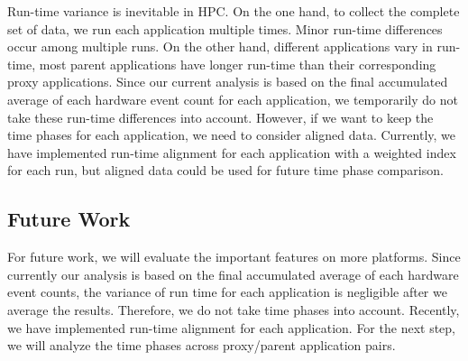 Run-time variance is inevitable in HPC. On the one hand, to collect the complete set of data, we run each application multiple times. Minor run-time differences occur among multiple runs. On the other hand, different applications vary in run-time, \eg most parent applications have longer run-time than their corresponding proxy applications. Since our current analysis is based on the final accumulated average of each hardware event count for each application, we temporarily do not take these run-time differences into account. However, if we want to keep the time phases for each application, we need to consider aligned data. Currently, we have implemented run-time alignment for each application with a weighted index for each run, but aligned data could be used for future time phase comparison. 
\subsection{Future Work}
For future work, we will evaluate the important features on more platforms.
Since currently our analysis is based on the final accumulated average of each hardware event counts, the variance of run time for each application is negligible after we average the results. Therefore, we do not take time phases into account. Recently, we have implemented run-time alignment for each application. For the next step, we will analyze the time phases across proxy/parent application pairs.

